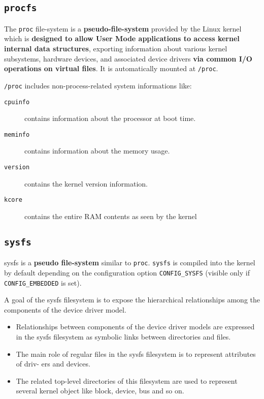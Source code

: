 \documentclass[10pt,a4paper]{article}
\begin{document}
\subsection{\texttt{procfs}}

The \texttt{proc} file-system is a \textbf{pseudo-file-system} provided by the Linux kernel which is \textbf{designed to allow User Mode applications to access kernel internal data structures}, exporting information about various kernel subsystems, hardware devices, and associated device drivers \textbf{via common I/O operations on virtual files}. It is automatically mounted at \texttt{/proc}. 

\texttt{/proc} includes non-process-related system informations like:

\begin{description}
\item[\texttt{cpuinfo}] contains information about the processor at boot time.
\item[\texttt{meminfo}] contains information about the memory usage.
\item[\texttt{version}] contains the kernel version information.
\item[\texttt{kcore}] contains the entire RAM contents as seen by the kernel
\end{description}

\subsection{\texttt{sysfs}}

sysfs is a \textbf{pseudo file-system} similar to \texttt{proc}. \texttt{sysfs} is compiled into the kernel by default depending on the configuration option \texttt{CONFIG\_SYSFS} (visible only if \texttt{CONFIG\_EMBEDDED} is set).

A goal of the sysfs filesystem is to expose the hierarchical relationships among the components of the device driver model. 
\begin{itemize}
\item Relationships between components of the device driver models are expressed in the sysfs filesystem as symbolic links between directories and files.
\item The main role of regular files in the sysfs filesystem is to represent attributes of driv-
ers and devices. 
\item The related top-level directories of this filesystem are used to represent several kernel object like block, device, bus and so on.

\end{itemize}
\end{document}
